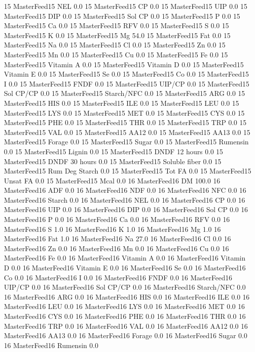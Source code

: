 \documentclass[letterpaper,10pt,english]{sphinxmanual}
\begin{document}
\begin{sphinxVerbatim}[commandchars=\\\{\},numbers=left,firstnumber=1,stepnumber=1]
15 MasterFeed15 NEL 0.0
15 MasterFeed15 CP 0.0
15 MasterFeed15 UIP 0.0
15 MasterFeed15 DIP 0.0
15 MasterFeed15 Sol CP 0.0
15 MasterFeed15 P 0.0
15 MasterFeed15 Ca 0.0
15 MasterFeed15 RFV 0.0
15 MasterFeed15 S 0.0
15 MasterFeed15 K 0.0
15 MasterFeed15 Mg 54.0
15 MasterFeed15 Fat 0.0
15 MasterFeed15 Na 0.0
15 MasterFeed15 Cl 0.0
15 MasterFeed15 Zn 0.0
15 MasterFeed15 Mn 0.0
15 MasterFeed15 Cu 0.0
15 MasterFeed15 Fe 0.0
15 MasterFeed15 Vitamin A 0.0
15 MasterFeed15 Vitamin D 0.0
15 MasterFeed15 Vitamin E 0.0
15 MasterFeed15 Se 0.0
15 MasterFeed15 Co 0.0
15 MasterFeed15 I 0.0
15 MasterFeed15 FNDF 0.0
15 MasterFeed15 UIP/CP 0.0
15 MasterFeed15 Sol CP/CP 0.0
15 MasterFeed15 Starch/NFC 0.0
15 MasterFeed15 ARG 0.0
15 MasterFeed15 HIS 0.0
15 MasterFeed15 ILE 0.0
15 MasterFeed15 LEU 0.0
15 MasterFeed15 LYS 0.0
15 MasterFeed15 MET 0.0
15 MasterFeed15 CYS 0.0
15 MasterFeed15 PHE 0.0
15 MasterFeed15 THR 0.0
15 MasterFeed15 TRP 0.0
15 MasterFeed15 VAL 0.0
15 MasterFeed15 AA\PYGZsh{}12 0.0
15 MasterFeed15 AA\PYGZsh{}13 0.0
15 MasterFeed15 \PYGZpc{} Forage 0.0
15 MasterFeed15 Sugar \PYGZpc{} 0.0
15 MasterFeed15 Rumensin 0.0
15 MasterFeed15 Lignin 0.0
15 MasterFeed15 DNDF 12 hours 0.0
15 MasterFeed15 DNDF 30 hours 0.0
15 MasterFeed15 Soluble fiber 0.0
15 MasterFeed15 Rum Deg Starch 0.0
15 MasterFeed15 Tot FA 0.0
15 MasterFeed15 Unsat FA 0.0
15 MasterFeed15 Mcal 0.0
16 MasterFeed16 DM 100.0
16 MasterFeed16 ADF 0.0
16 MasterFeed16 NDF 0.0
16 MasterFeed16 NFC 0.0
16 MasterFeed16 Starch 0.0
16 MasterFeed16 NEL 0.0
16 MasterFeed16 CP 0.0
16 MasterFeed16 UIP 0.0
16 MasterFeed16 DIP 0.0
16 MasterFeed16 Sol CP 0.0
16 MasterFeed16 P 0.0
16 MasterFeed16 Ca 0.0
16 MasterFeed16 RFV 0.0
16 MasterFeed16 S 1.0
16 MasterFeed16 K 1.0
16 MasterFeed16 Mg 1.0
16 MasterFeed16 Fat 1.0
16 MasterFeed16 Na 27.0
16 MasterFeed16 Cl 0.0
16 MasterFeed16 Zn 0.0
16 MasterFeed16 Mn 0.0
16 MasterFeed16 Cu 0.0
16 MasterFeed16 Fe 0.0
16 MasterFeed16 Vitamin A 0.0
16 MasterFeed16 Vitamin D 0.0
16 MasterFeed16 Vitamin E 0.0
16 MasterFeed16 Se 0.0
16 MasterFeed16 Co 0.0
16 MasterFeed16 I 0.0
16 MasterFeed16 FNDF 0.0
16 MasterFeed16 UIP/CP 0.0
16 MasterFeed16 Sol CP/CP 0.0
16 MasterFeed16 Starch/NFC 0.0
16 MasterFeed16 ARG 0.0
16 MasterFeed16 HIS 0.0
16 MasterFeed16 ILE 0.0
16 MasterFeed16 LEU 0.0
16 MasterFeed16 LYS 0.0
16 MasterFeed16 MET 0.0
16 MasterFeed16 CYS 0.0
16 MasterFeed16 PHE 0.0
16 MasterFeed16 THR 0.0
16 MasterFeed16 TRP 0.0
16 MasterFeed16 VAL 0.0
16 MasterFeed16 AA\PYGZsh{}12 0.0
16 MasterFeed16 AA\PYGZsh{}13 0.0
16 MasterFeed16 \PYGZpc{} Forage 0.0
16 MasterFeed16 Sugar \PYGZpc{} 0.0
16 MasterFeed16 Rumensin 0.0

\end{sphinxVerbatim}
\end{document}
